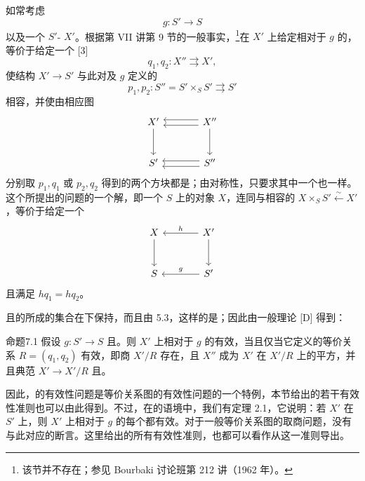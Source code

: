 如常考虑
\[
g:S'\longrightarrow S
\]
以及一个 $S'$- $X'$。根据第 VII 讲第 9 节的一般事实，\footnote{该节并不存在；参见 Bourbaki 讨论班第 212 讲（1962 年）。}在 $X'$ 上给定相对于 $g$ 的，等价于给定一个 [3]
\[
q_1,q_2:X''\rightrightarrows X',
\]
使结构 $X'\to S'$ 与此对及 $g$ 定义的
\[
p_1,p_2:S''=S'\times_S S'\rightrightarrows S'
\]
相容，并使由相应图
\[
\begin{tikzcd}[column sep=large,row sep=large]
X'\arrow[d]&X''\arrow[l,shift left=.65ex]\arrow[l,shift right=.65ex]\arrow[d]\\
S'&S''\arrow[l,shift left=.65ex]\arrow[l,shift right=.65ex]
\end{tikzcd}
\]
分别取 $p_1,q_1$ 或 $p_2,q_2$ 得到的两个方块都是；由对称性，只要求其中一个也一样。这个所提出的问题的一个解，即一个 $S$ 上的对象 $X$，连同与相容的 $X\times_S S'\xleftarrow{\sim}X'$，等价于给定一个
\[
\begin{tikzcd}[column sep=large,row sep=large]
X\arrow[d]&X'\arrow[l,"h"']\arrow[d]\\
S&S'\arrow[l,"g"']
\end{tikzcd}
\]
且满足 $hq_1=hq_2$。

且的所成的集合在下保持，而且由 5.3，这样的是；因此由一般理论 [D] 得到：

\begin{SGAresult}{命题}{7.1}
假设 $g:S'\to S$ 且。则 $X'$ 上相对于 $g$ 的有效，当且仅当它定义的等价关系 $R=(q_1,q_2)$ 有效，即商 $X'/R$ 存在，且 $X''$ 成为 $X'$ 在 $X'/R$ 上的平方，并且典范 $X'\to X'/R$ 且。
\end{SGAresult}
因此，的有效性问题是等价关系图的有效性问题的一个特例，本节给出的若干有效性准则也可以由此得到。不过，在的语境中，我们有定理 2.1，它说明：若 $X'$ 在 $S'$ 上，则 $X'$ 上相对于 $g$ 的每个都有效。对于一般等价关系图的取商问题，没有与此对应的断言。这里给出的所有有效性准则，也都可以看作从这一准则导出。

